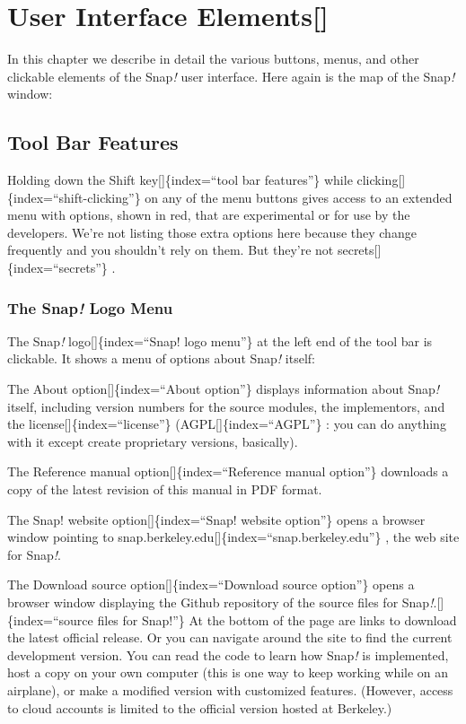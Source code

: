 \documentclass[
  letterpaper,
]{book}
\begin{document}

\chapter{User Interface Elements{[}{]}}\label{user-interface-elements}

In this chapter we describe in detail the various buttons, menus, and
other clickable elements of the Snap\emph{!} user interface. Here again
is the map of the Snap\emph{!} window:

\section{Tool Bar Features}\label{tool-bar-features}

Holding down the Shift key{[}{]}\{index=``tool bar features''\} while
clicking{[}{]}\{index=``shift-clicking''\} on any of the menu buttons
gives access to an extended menu with options, shown in red, that are
experimental or for use by the developers. We're not listing those extra
options here because they change frequently and you shouldn't rely on
them. But they're not secrets{[}{]}\{index=``secrets''\} .

\subsection{\texorpdfstring{The Snap\emph{!} Logo
Menu}{The Snap! Logo Menu}}\label{the-snap-logo-menu}

The Snap\emph{!} logo{[}{]}\{index=``Snap! logo menu''\} at the left end
of the tool bar is clickable. It shows a menu of options about
Snap\emph{!} itself:

The About option{[}{]}\{index=``About option''\} displays information
about Snap\emph{!} itself, including version numbers for the source
modules, the implementors, and the license{[}{]}\{index=``license''\}
(AGPL{[}{]}\{index=``AGPL''\} : you can do anything with it except
create proprietary versions, basically).

The Reference manual option{[}{]}\{index=``Reference manual option''\}
downloads a copy of the latest revision of this manual in PDF format.

The Snap! website option{[}{]}\{index=``Snap! website option''\} opens a
browser window pointing to
snap.berkeley.edu{[}{]}\{index=``snap.berkeley.edu''\} , the web site
for Snap\emph{!}.

The Download source option{[}{]}\{index=``Download source option''\}
opens a browser window displaying the Github repository of the source
files for Snap\emph{!}.{[}{]}\{index=``source files for Snap!''\} At the
bottom of the page are links to download the latest official release. Or
you can navigate around the site to find the current development
version. You can read the code to learn how Snap\emph{!} is implemented,
host a copy on your own computer (this is one way to keep working while
on an airplane), or make a modified version with customized features.
(However, access to cloud accounts is limited to the official version
hosted at Berkeley.)
\end{document}
